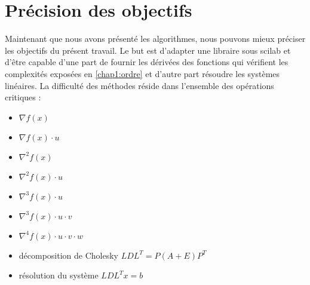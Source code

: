 % 
% 
% 
% 
% 
% 
% 





\section{Pr\'ecision des objectifs}
Maintenant que nous avons pr\'esent\'e les algorithmes, nous pouvons mieux pr\'eciser les objectifs du pr\'esent travail.
Le but est d'adapter une libraire sous scilab et d'être capable d'une part de fournir les d\'eriv\'ees des fonctions qui v\'erifient
les complexit\'es expos\'ees en \ref{chap1:ordre} et d'autre part r\'esoudre les syst\`emes lin\'eaires.
La difficult\'e des m\'ethodes r\'eside dans l'ensemble des op\'erations critiques : 
\begin{itemize}
\item $\nabla f(x)$
\item $\nabla f(x)\cdot u$
\item $\nabla^2 f(x)$
\item $\nabla^2 f(x)\cdot u$
\item $\nabla^3 f(x)\cdot u$
\item $\nabla^3 f(x)\cdot u\cdot v$
\item $\nabla^4 f(x)\cdot u\cdot v \cdot w$
\item d\'ecomposition de Cholesky $LDL^T = P(A+E)P^T$
\item r\'esolution du syst\`eme $LDL^Tx =b$
\end{itemize}


